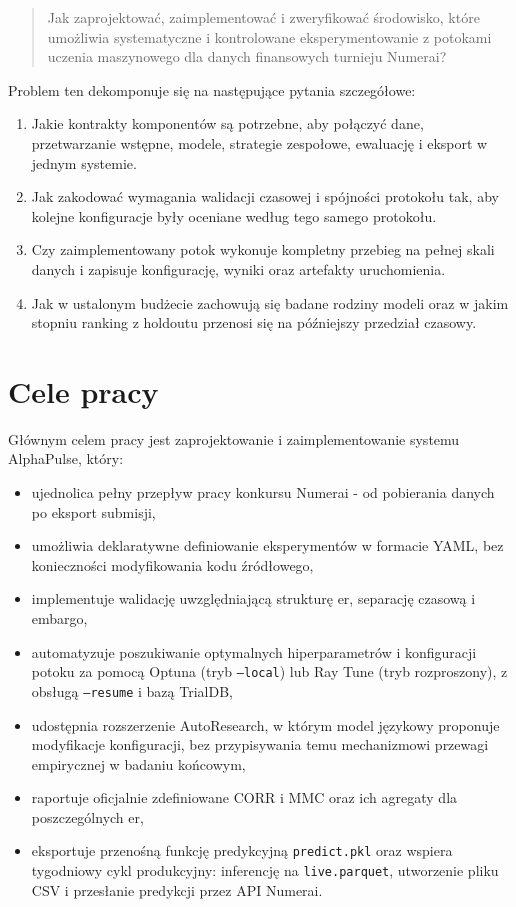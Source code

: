\documentclass[12pt,a4paper]{report}
\begin{document}
\begin{quote}
Jak zaprojektować, zaimplementować i zweryfikować środowisko, które umożliwia
systematyczne i kontrolowane eksperymentowanie z potokami uczenia maszynowego
dla danych finansowych turnieju Numerai?
\end{quote}

Problem ten dekomponuje się na następujące pytania szczegółowe:
\begin{enumerate}[label=\arabic*.]\item Jakie kontrakty komponentów są potrzebne, aby połączyć dane, przetwarzanie wstępne,
modele, strategie zespołowe, ewaluację i eksport w jednym systemie.
\item Jak zakodować wymagania walidacji czasowej i spójności protokołu tak, aby kolejne
konfiguracje były oceniane według tego samego protokołu.
\item Czy zaimplementowany potok wykonuje kompletny przebieg na pełnej skali danych
i zapisuje konfigurację, wyniki oraz artefakty uruchomienia.
\item Jak w ustalonym budżecie zachowują się badane rodziny modeli oraz w jakim stopniu
ranking z holdoutu przenosi się na późniejszy przedział czasowy.\end{enumerate}

\section{Cele pracy}
Głównym celem pracy jest zaprojektowanie i zaimplementowanie systemu AlphaPulse,
który:
\begin{itemize}\item ujednolica pełny przepływ pracy konkursu Numerai - od pobierania danych po eksport submisji,
\item umożliwia deklaratywne definiowanie eksperymentów w formacie YAML, bez
konieczności modyfikowania kodu źródłowego,
\item implementuje walidację uwzględniającą strukturę er, separację czasową i embargo,
\item automatyzuje poszukiwanie optymalnych hiperparametrów i konfiguracji potoku za
pomocą Optuna (tryb \texttt{--local}) lub Ray Tune (tryb rozproszony), z obsługą
\texttt{--resume} i bazą TrialDB,
\item udostępnia rozszerzenie AutoResearch, w którym model językowy proponuje
modyfikacje konfiguracji, bez przypisywania temu mechanizmowi przewagi empirycznej
w badaniu końcowym,
\item raportuje oficjalnie zdefiniowane CORR i MMC oraz ich agregaty dla poszczególnych er,
\item eksportuje przenośną funkcję predykcyjną \texttt{predict.pkl} oraz wspiera
tygodniowy cykl produkcyjny: inferencję na \texttt{live.parquet}, utworzenie pliku
CSV i przesłanie predykcji przez API Numerai.\end{itemize}
\end{document}
